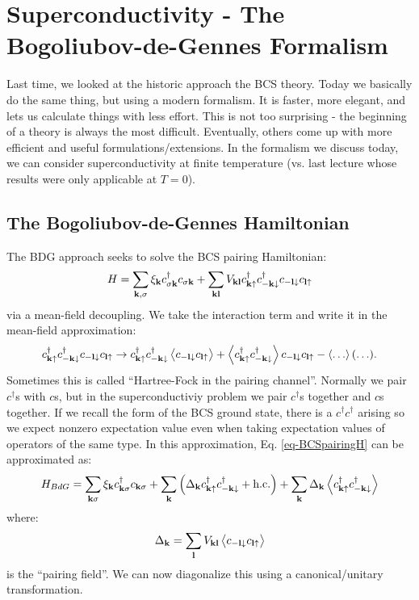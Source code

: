 \section{Superconductivity - The Bogoliubov-de-Gennes Formalism}
Last time, we looked at the historic approach the BCS theory. Today we basically do the same thing, but using a modern formalism. It is faster, more elegant, and lets us calculate things with less effort. This is not too surprising - the beginning of a theory is always the most difficult. Eventually, others come up with more efficient and useful formulations/extensions. In the formalism we discuss today, we can consider superconductivity at finite temperature (vs. last lecture whose results were only applicable at $T = 0$).

\subsection{The Bogoliubov-de-Gennes Hamiltonian}
The BDG approach seeks to solve the BCS pairing Hamiltonian:
\begin{equation}\label{eq-BCSpairingH}
    H = \sum_{\mathbf{k}, \sigma} \xi_{\mathbf{k}}c^\dagger_{\sigma\mathbf{k}}c_{\sigma\mathbf{k}} + \sum_{\mathbf{k}\mathbf{l}}V_{\mathbf{k}\mathbf{l}}c^\dagger_{\mathbf{k}\uparrow}c^\dagger_{-\mathbf{k}\downarrow}c_{-\mathbf{l}\downarrow}c_{\mathbf{l}\uparrow}
\end{equation}
via a mean-field decoupling. We take the interaction term and write it in the mean-field approximation:
\begin{equation}
    c^\dagger_{\mathbf{k}\uparrow}c^\dagger_{-\mathbf{k}\downarrow}c_{-\mathbf{l}\downarrow}c_{\mathbf{l}\uparrow} \to c^\dagger_{\mathbf{k}\uparrow}c^\dagger_{-\mathbf{k}\downarrow}\left< c_{-\mathbf{l}\downarrow}c_{\mathbf{l}\uparrow} \right> + \left< c^\dagger_{\mathbf{k}\uparrow}c^\dagger_{-\mathbf{k}\downarrow} \right> c_{-\mathbf{l}\downarrow}c_{\mathbf{l}\uparrow} - \left< \ldots \right>(\ldots).
\end{equation}
Sometimes this is called ``Hartree-Fock in the pairing channel''. Normally we pair $c^\dag$s with $c$s, but in the superconductiviy problem we pair $c^\dag$s together and $c$s together. If we recall the form of the BCS ground state, there is a $c^\dag c^\dag$ arising so we expect nonzero expectation value even when taking expectation values of operators of the same type. In this approximation, Eq. \eqref{eq-BCSpairingH} can be approximated as:
\begin{equation}
    H_{BdG} = \sum_{\mathbf{k}\sigma}\xi_{\mathbf{k}}c^\dagger_{\mathbf{k}\sigma}c_{\mathbf{k}\sigma} + \sum_{\mathbf{k}}\left(\Delta_{\mathbf{k}}c^\dagger_{\mathbf{k}\uparrow}c^\dagger_{-\mathbf{k}\downarrow} + \text{h.c.}\right) + \sum_{\mathbf{k}}\Delta_{\mathbf{k}}\left< c^\dagger_{\mathbf{k}\uparrow}c^\dagger_{-\mathbf{k}\downarrow} \right>
\end{equation}
where:
\begin{equation}
    \Delta_{\mathbf{k}} = \sum_{\mathbf{l}}V_{\mathbf{k}\mathbf{l}}\left< c_{-\mathbf{l}\downarrow}c_{\mathbf{l}\uparrow} \right>
\end{equation}
is the ``pairing field''. We can now diagonalize this using a canonical/unitary transformation.

